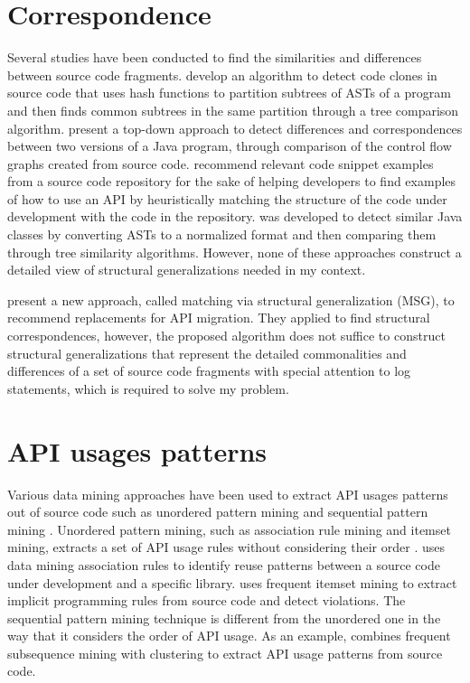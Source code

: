 \section{Correspondence}  \label{ch7-corr}
Several studies have been conducted to find the similarities and differences between source code fragments. \citet{baxter1998clone} develop an algorithm to detect code clones in source code that uses hash functions to partition subtrees of ASTs of a program and then finds common subtrees in the same partition through a tree comparison algorithm. \citet{apiwattanapong2004differencing} present a top-down approach to detect differences and correspondences between two versions of a Java program, through comparison of the control flow graphs created from source code. \citet{holmes2005strathcona} recommend relevant code snippet examples from a source code repository for the sake of helping developers to find examples of how to use an API by heuristically matching the structure of the code under development with the code in the repository.  \cite{sager2006detecting} was developed to detect similar Java classes by converting ASTs to a normalized format and then comparing them through tree similarity algorithms. However, none of these approaches construct a detailed view of structural generalizations needed in my context.



\citet{2014:uofc:cossette} present a new approach, called matching via structural generalization (MSG), to recommend replacements for API migration. They applied  to find structural correspondences, however, the proposed algorithm does not suffice to construct structural generalizations that represent the detailed commonalities and differences of a set of source code fragments with special attention to log statements, which is required to solve my problem.

\section{API usages patterns}  \label{ch7-usage-patterns}
Various data mining approaches have been used to extract API usages patterns out of source code such as unordered pattern mining and sequential pattern mining \cite{robillard2013automated}. Unordered pattern mining, such as association rule mining and itemset mining, extracts a set of API usage rules without considering their order \cite{agrawal1994fast}.  \cite{2000:icse:michail} uses data mining association rules to identify reuse patterns between a source code under development and a specific library.  \cite{li2005pr} uses frequent itemset mining to extract implicit programming rules from source code and detect violations. The sequential pattern mining technique is different from the unordered one in the way that it considers the order of API usage. As an example,  \cite{2006:msr:xie} combines frequent subsequence mining with clustering to extract API usage patterns from source code.

